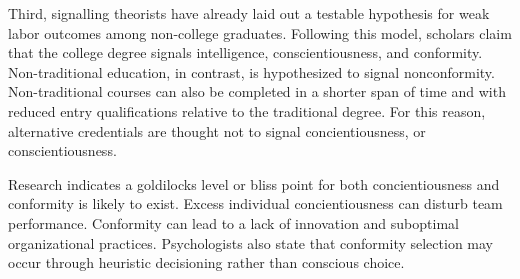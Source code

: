 \documentclass[review]{elsarticle}
\begin{document}
Third, signalling theorists have already laid out a testable hypothesis for weak labor outcomes among non-college graduates.
Following this model, scholars claim that the college degree signals intelligence, conscientiousness, and conformity\cite{caplan2018case}.
Non-traditional education, in contrast, is hypothesized to signal nonconformity.
Non-traditional courses can also be completed in a shorter span of time and with reduced entry qualifications relative to the traditional degree.
For this reason, alternative credentials are thought not to signal concientiousness, or conscientiousness.






Research indicates a goldilocks level or bliss point for both concientiousness and conformity is likely to exist.
Excess individual concientiousness can disturb team performance\cite{curcseu2019personality}.
Conformity can lead to a lack of innovation and suboptimal organizational practices\cite{symon2006neglected}.
Psychologists also state that conformity selection may occur through heuristic decisioning rather than conscious choice.
\end{document}

